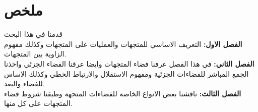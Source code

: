 \chapter*{ملخص}
\noindent
قدمنا في هذا البحث\\
\textbf{الفصل الاول: } التعريف الاساسي للمتجهات والعمليات على المتجهات وكذلك  مفهوم الزاوية بين المتجهات.\\
\textbf{الفصل الثاني: }في هذا الفصل عرفنا فضاء المتجهات وايضا عرفنا الفضاء الجزئي واخذنا الجمع المباشر للفضاءات الجزئية ومفهوم الاستقلال والارتباط الخطي وكذلك الاساس للفضاء والبعد.\\
\textbf{الفصل الثالث:} ناقشنا بعض الانواع الخاصة للفضاءات المتجهة وطبقنا شروط فضاء المتجهات على كل منها.